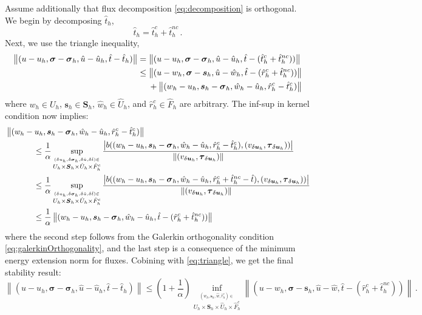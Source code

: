 \documentclass[letterpaper]{article}
\def\btau{\boldsymbol\tau}
\def\bsigma{\boldsymbol\sigma}
\def\bbeta{\boldsymbol\beta}
\newcommand{\bs}[1]{\boldsymbol{#1}}
\newcommand{\norm}[1]{\left\| #1 \right\|}
\newcommand{\snorm}[1]{\left| #1 \right|}
\newcommand{\vdeltau}{v_{\delta\bs u_h}}
\newcommand{\taudeltau}{\btau_{\delta\bs u_h}}
\begin{document}
Assume additionally that flux decomposition \eqref{eq:decomposition} is
orthogonal. We begin by decomposing $\hat t_h$,
\begin{equation}
\hat t_h=\hat t_h^{c}+\hat t_h^{nc}\,.
\label{eq:fluxdecomposition}
\end{equation}
Next, we use the triangle inequality,
\begin{align}
\label{eq:triangle}
\norm{(u-u_h,\bsigma-\bsigma_h,\hat u-\hat u_h, \hat t-\hat t_h)}&=
\norm{(u-u_h,\bsigma-\bsigma_h,\hat u-\hat u_h, \hat t-(\hat t_h^c+\hat t_h^{nc}))}\nonumber\\
&\le\norm{(u-w_h,\bsigma-\bs s_h,\hat u-\hat w_h, \hat t-(\hat r_h^c+\hat t_h^{nc}))}\\
&\hspace{3ex}+\norm{(w_h-u_h,\bs s_h-\bsigma_h,\hat w_h-\hat u_h, \hat r_h^c-\hat t_h^c)}\nonumber
\end{align}
where $w_h\in U_h$, $\bs s_h\in\bs S_h$, $\hat w_h\in\hat U_h$, and $\hat
r_h^{c}\in\hat F_h$ are arbitrary. The inf-sup in kernel condition now
implies:
\begin{align}
\label{eq:estimate}
&\norm{(w_h-u_h,\bs s_h-\bsigma_h,\hat w_h-\hat u_h, \hat r_h^c-\hat t_h^c)}\\
&\hspace{8ex}\le\frac{1}{\alpha}
\sup_{\stackrel{
(\delta u_h,\delta\bsigma_h,\delta\hat u,\delta\hat t)\in}
{U_h\times\bs S_h\times\hat U_h\times\hat F_h^c}
}
\frac{\snorm{
b( (w_h-u_h,\bs s_h-\bsigma_h,\hat w_h-\hat u_h,\hat r_h^c-\hat t_h^c),
(\vdeltau,\taudeltau))
}}
{\norm{(\vdeltau,\taudeltau)}}\nonumber\\
&\hspace{8ex}\le\frac{1}{\alpha}
\sup_{\stackrel{
(\delta u_h,\delta\bsigma_h,\delta\hat u,\delta\hat t)\in}
{U_h\times\bs S_h\times\hat U_h\times\hat F_h^c}
}
\frac{\snorm{
b( (w_h-u_h,\bs s_h-\bsigma_h,\hat w_h-\hat u_h,\hat r_h^c+\hat t_h^{nc}-\hat t),
(\vdeltau,\taudeltau))
}}
{\norm{(\vdeltau,\taudeltau)}}\nonumber\\
&\hspace{8ex}\le\frac{1}{\alpha}
\norm{(w_h-u_h,\bs s_h-\bsigma_h,\hat w_h-\hat u_h,\hat t-(\hat r_h^c+\hat
t_h^{nc}))}
\end{align}
where the second step follows from the Galerkin orthogonality condition
\eqref{eq:galerkinOrthogonality}, and the last step is a consequence of the
minimum energy extension norm for fluxes. Cobining with \eqref{eq:triangle},
we get the final stability result:
\begin{equation}
\norm{(u-u_h,\bsigma-\bsigma_h,\hat u-\hat u_h,\hat t-\hat t_h)}
\leq\left(1+\frac{1}{\alpha}\right)
\inf_{\stackrel{
(w_h,\bs s_h,\hat w,\hat r_h^c)\in}
{U_h\times\bs S_h\times\hat U_h\times\hat F_h^c}
}
\norm{(u-w_h,\bsigma-\bs s_h,\hat u-\hat w,\hat t-(\hat r_h^c+\hat t_h^{nc}))}
\,.
\label{eq:stability}
\end{equation}
\end{document}
